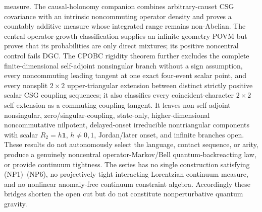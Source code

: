 measure.  The causal-holonomy companion combines arbitrary-causet CSG
covariance with an intrinsic noncommuting operator density and proves a
countably additive measure whose integrated range remains non-Abelian.
The central operator-growth classification supplies an infinite geometry
POVM but proves that its probabilities are only direct mixtures; its
positive noncentral control fails DGC.  The CPOBC rigidity theorem further
excludes the complete finite-dimensional self-adjoint nonsingular branch
without a sign assumption, every noncommuting leading tangent at one exact
four-event scalar point, and every nonsplit \(2\times2\)
upper-triangular extension between distinct strictly positive scalar CSG
coupling sequences; it also classifies every coincident-character
\(2\times2\) self-extension as a commuting coupling tangent.  It leaves
non-self-adjoint nonsingular, zero/singular-coupling, state-only,
higher-dimensional noncommutative nilpotent, delayed-onset irreducible
nontriangular components with scalar
\(R_2=h\mathbf1\), \(h\ne0,1\), Jordan/later onset, and infinite branches
open.
These results do not autonomously
select the language, contact sequence, or arity, produce a genuinely
noncentral operator-Markov/Bell quantum-backreacting law, or provide
continuum tightness.
The series has no single
construction satisfying (NP1)--(NP6), no projectively tight interacting
Lorentzian continuum measure, and no nonlinear anomaly-free continuum
constraint algebra.  Accordingly these bridges shorten the open cut but do
not constitute nonperturbative quantum gravity.

